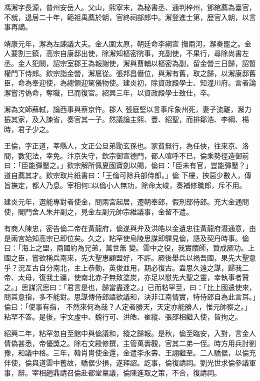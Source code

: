 \begin{pinyinscope}
 馮澥字長源，普州安岳人。父山，熙寧末，為秘書丞、通判梓州，鄧綰薦為臺官，不就，退居二十年，範祖禹薦於朝，官終祠部郎中。澥登進士第，歷官入朝，以言事再謫。



 靖康元年，澥為左諫議大夫。金人圍太原，朝廷命李綱宣
 撫兩河，澥奏罷之。金人要割三鎮，高宗自康邸出使，除澥知樞密院事，充副使，不果行，尋除尚書左丞。金人犯闕，詔宗室郡王為報謝使，澥與曹輔以樞密為副，留金營三日歸，詔暫權門下侍郎。欽宗詣金營，澥扈從。張邦昌僭位，與澥有舊，取之歸，以澥康邸舊臣，命為奉迎使，為總領迎駕儀物使。建炎初，除資政殿學士、知潼川府。言者論澥嘗污偽命，奪職，已而復官。紹興三年，以資政殿學士致仕，卒。



 澥為文師蘇軾，論西事與蔡京忤。郡人
 張庭堅以言事斥象州死，妻子流離，澥力振其家，及入諫省，奏官其一子。然議論主熙、豐、紹聖，而排鄒浩、李綱、楊時，君子少之。



 王倫，字正道，莘縣人，文正公旦弟勖玄孫也。家貧無行，為任俠，往來京、洛間，數犯法，幸免。汴京失守，欽宗御宣德門，都人喧呼不已，倫乘勢徑造御前曰：「臣能彈壓之。」欽宗解所佩夏國寶劍以賜，倫曰：「臣未有官，豈能彈壓？」道自薦其才。欽宗取片紙書曰：「王倫可除兵部侍郎。」倫
 下樓，挾惡少數人，傳旨撫定，都人乃息。宰相何□以倫小人無功，除命太峻，奏補修職郎，斥不用。



 建炎元年，選能專對者使金，問兩宮起居，遷朝奉郎，假刑部侍郎。充大金通問使，閣門舍人朱弁副之，見金左副元帥宗維議事，金留不遣。



 有商人陳忠，密告倫二帝在黃龍府，倫遂與弁及洪皓以金遺忠往黃龍府潛通意，由是兩宮始知高宗已即位矣。久之，粘罕使烏陵思謀即驛見倫，語及契丹時事。倫曰：「海上之盟，兩國約為兄弟，萬世無
 變。雲中之役，我實饋師，贊成厥功。上國之臣，嘗欲稱兵南來，先大聖惠顧盟好，不許。厥後舉兵以禍吾國，果先大聖意乎？況亙古自分南北，主上恭勤，英俊並用，期必復古。盍思久遠之謀，歸我二帝、太母，復我土疆，使南北赤子無致塗炭，亦足以慰先大聖之靈，幸執事者贊之。」思謀沉思曰：「君言是也，歸當盡達之。」已而粘罕至，曰：「比上國遣使來，問其意指，多不能對。思謀傳侍郎語欲議和，決非江南情實，特侍郎自為此言耳。」倫曰：「使事有指，
 不然來何為哉？人定者勝天，天定亦能勝人，惟元帥察之。」粘罕不答。是後，宇文虛中、魏行可、洪皓、崔縱、張邵相繼入使，皆拘之。



 紹興二年，粘罕忽自至館中與倫議和，縱之歸報。是秋，倫至臨安，入對，言金人情偽甚悉，帝優獎之。除右文殿修撰，主管萬壽觀，官其二弟一侄。時方用兵討劉豫，和議中格。三年，韓肖冑使金還，金遣李永壽、王詡繼至。二人驕倨，以倫充伴使，倫與道雲中舊故，驕倨少損，遂拜詔。訖事，倫復請祠。劉光世求倫參議軍
 事，辭。宰相趙鼎請召倫赴都堂稟議，倫陳進取之策，不合，復請祠。




\end{pinyinscope}

